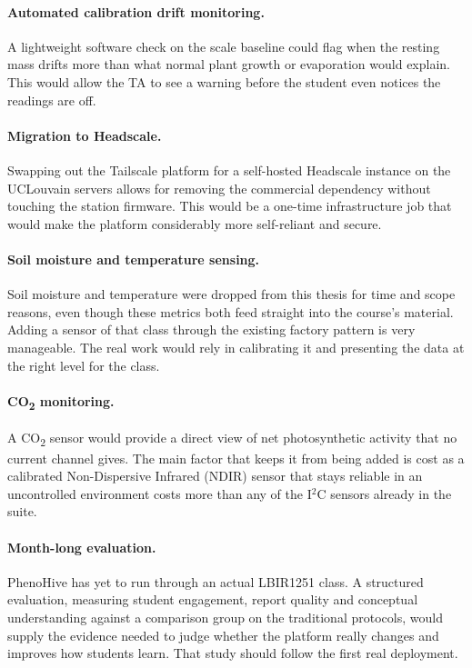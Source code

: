 \paragraph{Automated calibration drift monitoring.}
A lightweight software check on the scale baseline could flag when the resting mass drifts more than what normal plant growth or evaporation would explain. This would allow the TA to see a warning before the student even notices the readings are off.

\paragraph{Migration to Headscale.}
Swapping out the Tailscale platform for a self-hosted Headscale instance on the UCLouvain servers allows for removing the commercial dependency without touching the station firmware. This would be a one-time infrastructure job that would make the platform considerably more self-reliant and secure.

\paragraph{Soil moisture and temperature sensing.}
Soil moisture and temperature were dropped from this thesis for time and scope reasons, even though these metrics both feed straight into the course's material. Adding a sensor of that class through the existing factory pattern is very manageable. The real work would rely in calibrating it and presenting the data at the right level for the class.

\paragraph{CO\textsubscript{2} monitoring.}
A CO\textsubscript{2} sensor would provide a direct view of net photosynthetic activity that no current channel gives. The main factor that keeps it from being added is cost as a calibrated Non-Dispersive Infrared (NDIR) sensor that stays reliable in an uncontrolled environment costs more than any of the I$^2$C sensors already in the suite.

\paragraph{Month-long evaluation.}\label{sec:future-work-month}
PhenoHive has yet to run through an actual LBIR1251 class. A structured evaluation, measuring student engagement, report quality and conceptual understanding against a comparison group on the traditional protocols, would supply the evidence needed to judge whether the platform really changes and improves how students learn. That study should follow the first real deployment.

